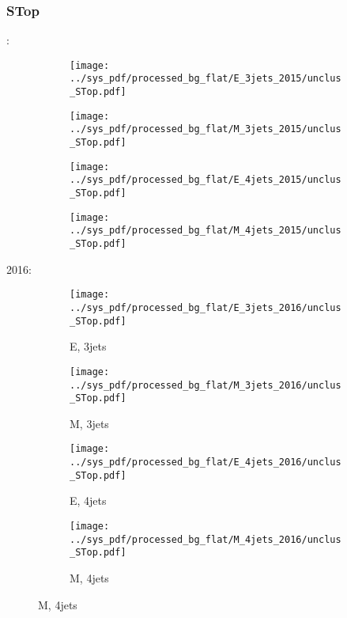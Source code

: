 \documentclass{beamer}
\begin{document}
\begin{frame}
\frametitle{STop}
\fontsize{5}{1}:
\begin{figure}
\centering
\begin{subfigure}[b]{0.24\textwidth}
\texttt{[image: ../sys\_pdf/processed\_bg\_flat/E\_3jets\_2015/unclus\_STop.pdf]}
\end{subfigure}
\begin{subfigure}[b]{0.24\textwidth}
\texttt{[image: ../sys\_pdf/processed\_bg\_flat/M\_3jets\_2015/unclus\_STop.pdf]}
\end{subfigure}
\begin{subfigure}[b]{0.24\textwidth}
\texttt{[image: ../sys\_pdf/processed\_bg\_flat/E\_4jets\_2015/unclus\_STop.pdf]}
\end{subfigure}
\begin{subfigure}[b]{0.24\textwidth}
\texttt{[image: ../sys\_pdf/processed\_bg\_flat/M\_4jets\_2015/unclus\_STop.pdf]}
\end{subfigure}
\end{figure}
2016:
\begin{figure}
\centering
\begin{subfigure}[b]{0.24\textwidth}
\texttt{[image: ../sys\_pdf/processed\_bg\_flat/E\_3jets\_2016/unclus\_STop.pdf]}
\captionsetup{font=tiny}
\caption{E, 3jets}
\end{subfigure}
\begin{subfigure}[b]{0.24\textwidth}
\texttt{[image: ../sys\_pdf/processed\_bg\_flat/M\_3jets\_2016/unclus\_STop.pdf]}
\captionsetup{font=tiny}
\caption{M, 3jets}
\end{subfigure}
\begin{subfigure}[b]{0.24\textwidth}
\texttt{[image: ../sys\_pdf/processed\_bg\_flat/E\_4jets\_2016/unclus\_STop.pdf]}
\captionsetup{font=tiny}
\caption{E, 4jets}
\end{subfigure}
\begin{subfigure}[b]{0.24\textwidth}
\texttt{[image: ../sys\_pdf/processed\_bg\_flat/M\_4jets\_2016/unclus\_STop.pdf]}
\captionsetup{font=tiny}
\caption{M, 4jets}
\end{subfigure}
\end{figure}
\end{frame}
\end{document}
